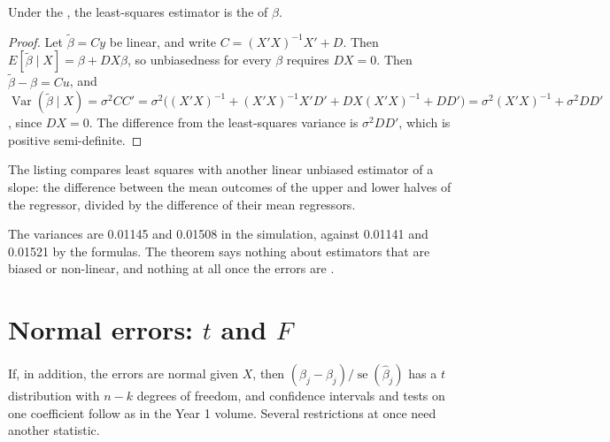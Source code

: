 \begin{theorem}\label{thm:b2:regression-inference:gauss-markov}
Under the , the least-squares estimator is the  of $\beta$.
\end{theorem}

\begin{proof}
Let $\tilde\beta = Cy$ be linear, and write $C = (X'X)^{-1}X' + D$. Then $E[\tilde\beta \mid X] = \beta + DX\beta$, so
unbiasedness for every $\beta$ requires $DX = 0$. Then $\tilde\beta - \beta = Cu$, and
$\operatorname{Var}(\tilde\beta \mid X) = \sigma^2CC' = \sigma^2\bigl((X'X)^{-1} + (X'X)^{-1}X'D' + DX(X'X)^{-1} +
DD'\bigr) = \sigma^2(X'X)^{-1} + \sigma^2DD'$, since $DX = 0$. The difference from the least-squares variance is
$\sigma^2DD'$, which is positive semi-definite.
\end{proof}

The listing compares least squares with another linear unbiased estimator of a slope: the difference between the mean
outcomes of the upper and lower halves of the regressor, divided by the difference of their mean regressors.

\label{lst:b2:regression-inference:gm}

\label{out:b2:regression-inference:gm}

The variances are 0.01145 and 0.01508 in the simulation, against 0.01141 and 0.01521 by the formulas. The theorem says
nothing about estimators that are biased or non-linear, and nothing at all once the errors are .

\section{Normal errors: $t$ and $F$}\label{sec:b2:regression-inference:tf}

If, in addition, the errors are normal given $X$, then $(\hat\beta_j - \beta_j)/\operatorname{se}(\hat\beta_j)$ has a $t$
distribution with $n - k$ degrees of freedom, and confidence intervals and tests on one coefficient follow as in the Year 1
volume. Several restrictions at once need another statistic.

